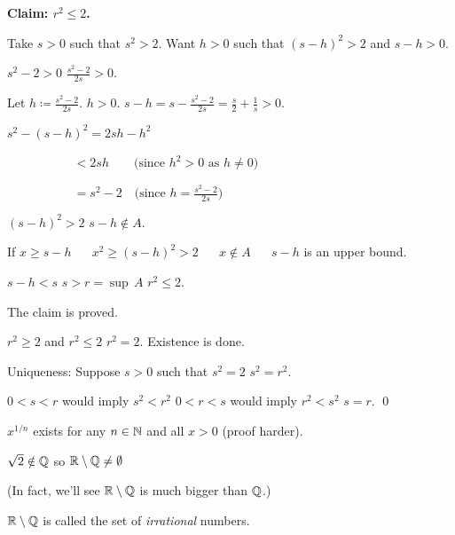 \documentclass[10pt,aspectratio=149]{beamer}
\begin{document}
\begin{frame}
\textbf{Claim: $r^2 \leq 2$.}

\medskip
\pause

Take $s > 0$ such that $s^2 > 2$.
\pause
\quad
Want $h > 0$ such that ${(s-h)}^2 > 2$ and $s-h > 0$.

\medskip
\pause

$s^2-2 > 0$ \wthus $\frac{s^2-2}{2s} > 0$.

\medskip
\pause

Let $h \coloneqq \frac{s^2-2}{2s}$.
\qquad
\pause
$h > 0$.
\qquad
\pause
$s-h=s-\frac{s^2-2}{2s} = \frac{s}{2}+\frac{1}{s} > 0$.

\medskip
\pause

$\displaystyle
s^2 - {(s-h)}^2 = 2sh - h^2
$

\medskip
\pause

$\displaystyle
\,\, \quad \qquad \qquad
  < 2sh \qquad \bigl( \text{since } h^2 > 0 \text{ as } h \not= 0 \bigr)
$

\medskip
\pause

$\displaystyle
\,\, \quad \qquad \qquad
  = s^2-2 \quad \bigl( \text{since } h = \tfrac{s^2-2}{2s} \bigr)
$

\medskip
\pause

\thus \quad ${(s-h)}^2 > 2$
\pause
\wthus
$s-h \notin A$.

\medskip
\pause

If
$x \geq s-h$ ~\thus~ $x^2 \geq {(s-h)}^2 > 2$ %
\pause
~\thus~ $x \notin A$
\pause
~\thus~ $s-h$ is an upper bound.

\medskip
\pause

$s-h < s$ \wthus $s > r = \sup \, A$ \wthus $r^2 \leq 2$.

\medskip
\pause

The claim is proved.

\medskip
\pause

$r^2 \geq 2$ and $r^2 \leq 2$ \wthus $r^2 = 2$.
\pause
\quad Existence is done.

\medskip
\pause

Uniqueness: 
Suppose $s > 0$ such that $s^2=2$
\pause
\wthus
$s^2=r^2$.

\medskip
\pause

$0 < s < r$ would imply $s^2 < r^2$
\pause
\quad
$0 < r < s$ would imply $r^2 < s^2$
\pause
\wthus $s=r$.
\qed
\end{frame}

\begin{frame}
$x^{1/n}$ exists for any $n \in {\mathbb{N}}$ and all $x > 0$ (proof harder).

\medskip
\pause

$\sqrt{2} \notin {\mathbb{Q}}$
\qquad
\pause
so
${\mathbb{R}} \setminus {\mathbb{Q}} \not= \emptyset$

\pause
(In fact, we'll see ${\mathbb{R}} \setminus {\mathbb{Q}}$ is much bigger than ${\mathbb{Q}}$.)

\medskip
\pause

${\mathbb{R}} \setminus {\mathbb{Q}}$ is called the set of \emph{irrational} numbers.


\end{frame}
\end{document}
